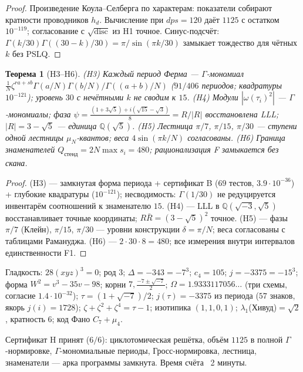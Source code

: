 \documentclass[11pt,a4paper]{article}
\theoremstyle{plain}
\newtheorem{theorem}{Теорема}
\theoremstyle{definition}
\theoremstyle{remark}
\newcommand{\QQ}{\mathbb{Q}}
\newcommand{\Ga}{\Gamma}
\newcommand{\disc}{\operatorname{disc}}
\begin{document}
\begin{proof}
Произведение Коула--Селберга по характерам: показатели собирают
кратности проводников $h_d$. Вычисление при $dps=120$ даёт $1125$ с
остатком $10^{-119}$; согласование с $\sqrt{\disc}$ из H1 точное.
Синус-подсчёт: $\Ga(k/30)\Ga((30-k)/30)=\pi/\sin(\pi k/30)$
замыкает тождество для чётных $k$ без PSLQ.
\end{proof}

\begin{theorem}[H3--H6]\label{th:H36}
\emph{(H3)} Каждый период Ферма --- $\Ga$-мономиал
$\frac1N\zeta^{ra+sb}\Ga(a/N)\Ga(b/N)/\Ga((a+b)/N)$ ($91/406$
периодов; квадратуры $10^{-121}$); уровень $30$ с нечётными $k$ не
сводим к $15$.
\emph{(H4)} Модули $|\omega(\tau_i)^2|$ --- $\Ga$-мономиалы;
фаза $\psi=\frac{(1+3\sqrt5)+i(\sqrt{15}-\sqrt3)}8=R/|R|$
восстановлена LLL; $|R|=3-\sqrt5$ --- единица $\QQ(\sqrt5)$.
\emph{(H5)} Лестница $\pi/7$, $\pi/15$, $\pi/30$ --- ступени одной
лестницы $\mu_N$-квантов; веса $4\sin(\pi k/N)$ согласованы.
\emph{(H6)} Граница знаменателей $Q_{\text{стенд}}=2N\max s_i=480$;
рационализация F замыкается без скана.
\end{theorem}

\begin{proof}
(H3) --- замкнутая форма периода + сертификат B ($69$ тестов,
$3.9\cdot10^{-36}$) + глубокие квадратуры ($10^{-121}$);
несводимость: $\Ga(1/30)$ не редуцируется инвентарём соотношений к
знаменателю $15$. (H4) --- LLL в $\QQ(\sqrt{-3},\sqrt5)$
восстанавливает точные координаты; $R\bar R=(3-\sqrt5)^2$ точное.
(H5) --- фазы $\pi/7$ (Клейн), $\pi/15$, $\pi/30$ --- уровни
конструкции $\delta=\pi/N$; веса согласованы с таблицами
Рамануджа. (H6) --- $2\cdot30\cdot8=480$; все измерения внутри
интервалов единственности F1.
\end{proof}

\begin{databox}
Гладкость: $28(xyz)^3=0$; род $3$; $\Delta=-343=-7^3$; $c_4=105$;
$j=-3375=-15^3$; форма $W^2=v^3-35v-98$; корни $7,
\frac{-7\pm\sqrt{-7}}2$; $\Omega=1.9333117056\ldots$ (три схемы,
согласие $1.4\cdot10^{-32}$); $\tau=(1+\sqrt{-7})/2$;
$j(\tau)=-3375$ из периода ($57$ знаков, якорь $j(i)=1728$);
$\zeta+\zeta^2+\zeta^4=\tau-1$; изотипика $(1,1,0,1)$;
$\lambda_1$(Хивуд)$=\sqrt2$, кратность $6$; код Фано $C_7+\mu_4$.
\end{databox}

\begin{statusbox}[итог]
Сертификат H принят ($6/6$): циклотомическая решётка, объём
$1125$ в полной $\Ga$-нормировке, $\Ga$-мономиальные периоды,
Гросс-нормировка, лестница, знаменатели --- арка программы
замкнута. Время счёта ~2 минуты.
\end{statusbox}
\end{document}

